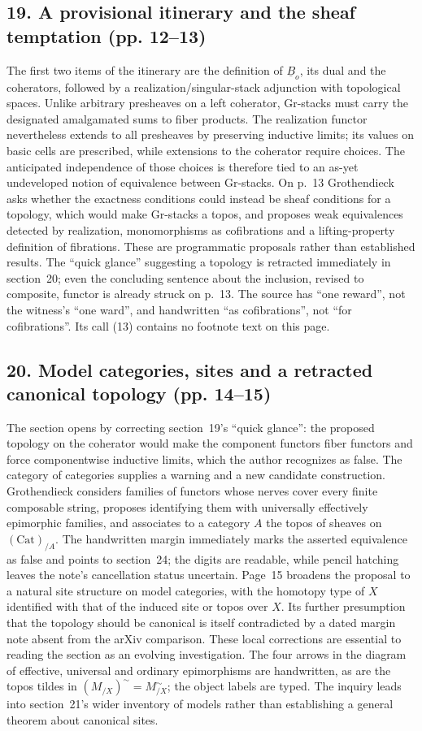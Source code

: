 \documentclass[10pt,oneside]{book}
\begin{document}
\subsection*{19. A provisional itinerary and the sheaf temptation (pp. 12--13)}
The first two items of the itinerary are the definition of $\underline B_o$, its dual and the coherators, followed by a realization/singular-stack adjunction with topological spaces. Unlike arbitrary presheaves on a left coherator, Gr-stacks must carry the designated amalgamated sums to fiber products. The realization functor nevertheless extends to all presheaves by preserving inductive limits; its values on basic cells are prescribed, while extensions to the coherator require choices. The anticipated independence of those choices is therefore tied to an as-yet undeveloped notion of equivalence between Gr-stacks. On p.~13 Grothendieck asks whether the exactness conditions could instead be sheaf conditions for a topology, which would make Gr-stacks a topos, and proposes weak equivalences detected by realization, monomorphisms as cofibrations and a lifting-property definition of fibrations. These are programmatic proposals rather than established results. The ``quick glance'' suggesting a topology is retracted immediately in section~20; even the concluding sentence about the inclusion, revised to composite, functor is already struck on p.~13. The source has ``one reward'', not the witness's ``one ward'', and handwritten ``as cofibrations'', not ``for cofibrations''. Its call (13) contains no footnote text on this page.

\subsection*{20. Model categories, sites and a retracted canonical topology (pp. 14--15)}
The section opens by correcting section~19's ``quick glance'': the proposed topology on the coherator would make the component functors fiber functors and force componentwise inductive limits, which the author recognizes as false. The category of categories supplies a warning and a new candidate construction. Grothendieck considers families of functors whose nerves cover every finite composable string, proposes identifying them with universally effectively epimorphic families, and associates to a category $A$ the topos of sheaves on $(\mathrm{Cat})_{/A}$. The handwritten margin immediately marks the asserted equivalence as false and points to section~24; the digits are readable, while pencil hatching leaves the note's cancellation status uncertain. Page~15 broadens the proposal to a natural site structure on model categories, with the homotopy type of $X$ identified with that of the induced site or topos over $X$. Its further presumption that the topology should be canonical is itself contradicted by a dated margin note absent from the arXiv comparison. These local corrections are essential to reading the section as an evolving investigation. The four arrows in the diagram of effective, universal and ordinary epimorphisms are handwritten, as are the topos tildes in $(M_{/X})^{\sim}=M^{\sim}_{/X}$; the object labels are typed. The inquiry leads into section~21's wider inventory of models rather than establishing a general theorem about canonical sites.
\end{document}
